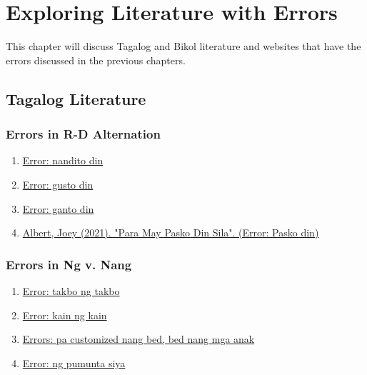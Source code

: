 \chapter{Exploring Literature with Errors}

This chapter will discuss Tagalog and Bikol literature and websites that have the errors discussed in the previous chapters.

\section{Tagalog Literature}
\subsection{Errors in R-D Alternation}
\begin{enumerate}
    \item \href{https://www.smartparenting.com.ph/parenting/baby/paano-malalaman-kung-hiyang-si-baby-sa-gatas-a1810-20210330}{Error: nandito din}
    \item \href{https://www.facebook.com/share/v/16AdpiPqVi/}{Error: gusto din}
    \item \href{https://www.reddit.com/r/dogsofrph/comments/1j2ywgu/ganto_din_ba_aso_nyo_mahilig_sa_yelo/}{Error: ganto din}
    \item \href{https://www.youtube.com/watch?v=LhA64RzycBk}{Albert, Joey (2021). "Para May Pasko Din Sila". (Error: Pasko din)} 
    
\end{enumerate}

\subsection{Errors in Ng v. Nang}

\begin{enumerate}
    \item \href{https://brainly.ph/question/21370957}{Error: takbo ng takbo}
    \item \href{https://www.facebook.com/teamagustintvvlogs/videos/kain-ng-kain-pero-bakit-hindi-tumataba-ano-daw-ang-aking-ginagawa/502889525820314/}{Error: kain ng kain}
    \item \href{https://www.facebook.com/groups/280224753328936/posts/1212892863395449/}{Errors: pa customized nang bed, bed nang mga anak}
    \item \href{https://harrypotter.fandom.com/f/p/3008625405222454882}{Error: ng pumunta siya}
\end{enumerate}


